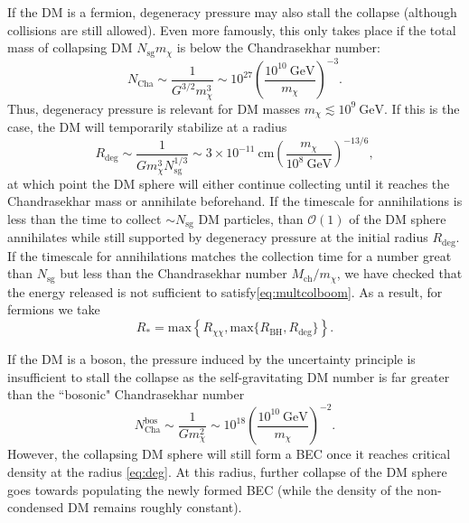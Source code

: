 \documentclass[preprintnumbers,amsmath,amssymb,prd,superscriptaddress]{revtex4}
\newcommand{\Eboom}{\mathcal{E}_\text{boom}}
\newcommand{\OO}{\mathcal{O}}
\newcommand{\GeV}{\text{GeV}}
\newcommand{\cm}{\text{cm}}
\def\r{\right)}
\def\l{\left(}
\begin{document}
If the DM is a fermion, degeneracy pressure may also stall the collapse (although collisions are still allowed). 
Even more famously, this only takes place if the total mass of collapsing DM $N_\text{sg} m_\chi$ is below the Chandrasekhar number:
\begin{equation}
N_\text{Cha} \sim \frac{1}{G^{3/2} m_\chi^3} \sim 10^{27} \l \frac{10^{10} ~\GeV}{m_\chi}\r^{-3}.
\end{equation}
Thus, degeneracy pressure is relevant for DM masses $m_\chi \lesssim 10^{9} ~\GeV$.
If this is the case, the DM will temporarily stabilize at a radius
\begin{equation}
\label{eq:deg}
R_\text{deg} \sim \frac{1}{G m_\chi^3 N_\text{sg}^{1/3}} \sim 3 \times 10^{-11} ~\cm \l\frac{m_\chi}{10^{8} ~\GeV}\r^{-13/6},
\end{equation}
at which point the DM sphere will either continue collecting until it reaches the Chandrasekhar mass or annihilate beforehand. 
If the timescale for annihilations is less than the time to collect $\sim N_\text{sg}$ DM particles, than $\OO(1)$ of the DM sphere annihilates while still supported by degeneracy pressure at the initial radius $R_\text{deg}$. 
If the timescale for annihilations matches the collection time for a number great than $N_\text{sg}$ but less than the Chandrasekhar number $M_\text{ch}/m_\chi$, we have checked that the energy released is not sufficient to satisfy\eqref{eq:multcolboom}. 
As a result, for fermions we take
\begin{equation}
R_* = \text{max}\left \{R_{\chi \chi}, \text{max}\{R_\text{BH}, R_\text{deg}\} \right \}. 
\end{equation}

If the DM is a boson, the pressure induced by the uncertainty principle is insufficient to stall the collapse as the self-gravitating DM number is far greater than the ``bosonic" Chandrasekhar number
\begin{equation}
N^\text{bos}_\text{Cha} \sim \frac{1}{G m_\chi^2} \sim 10^{18}  \l \frac{10^{10} ~\GeV}{m_\chi}\r^{-2}.
\end{equation}
However, the collapsing DM sphere will still form a BEC once it reaches critical density at the radius \eqref{eq:deg}. 
At this radius, further collapse of the DM sphere goes towards populating the newly formed BEC (while the density of the non-condensed DM remains roughly constant). 

\end{document}
